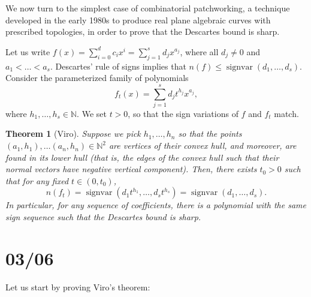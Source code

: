 \documentclass[11pt, a4paper]{article}
\newcommand{\NN}{\mathbb{N}}
\DeclareMathOperator{\sv}{signvar}
\theoremstyle{plain}
\newtheorem{thm}[prop]{Theorem}
\theoremstyle{definition}
\begin{document}
We now turn to the simplest case of combinatorial patchworking, a technique developed in the early 1980s to produce real plane algebraic curves with prescribed topologies, in order to prove that the Descartes bound is sharp.

Let us write $f(x)=\sum_{i=0}^d c_ix^i=\sum_{j=1}^s d_j x^{a_j}$, where all $d_j\neq 0$ and $a_1<\dots<a_s$. Descartes' rule of signs implies that $n(f)\leq \sv(d_1,\dots,d_s)$. Consider the parameterized family of polynomials
\[f_t(x)=\sum_{j=1}^s d_j t^{h_j} x^{a_j},\]
where $h_1,\dots, h_s\in \NN$. We set $t>0$, so that the sign variations of $f$ and $f_t$ match.
\begin{thm}[Viro] Suppose we pick $h_1,\dots,h_n$ so that the points $(a_1,h_1),\dots(a_n,h_n)\in\NN^2$ are vertices of their convex hull, and moreover, are found in its \emph{lower hull} (that is, the edges of the convex hull such that their normal vectors have negative vertical component). Then, there exists $t_0>0$ such that for any fixed $t\in (0,t_0)$,
\[n(f_t)=\sv(d_1t^{h_1},\dots,d_st^{h_s})=\sv(d_1,\dots, d_s).\]
In particular, for any sequence of coefficients, there is a polynomial with the same sign sequence such that the Descartes bound is sharp.
\end{thm}

\section{03/06}

Let us start by proving Viro's theorem:
\end{document}
